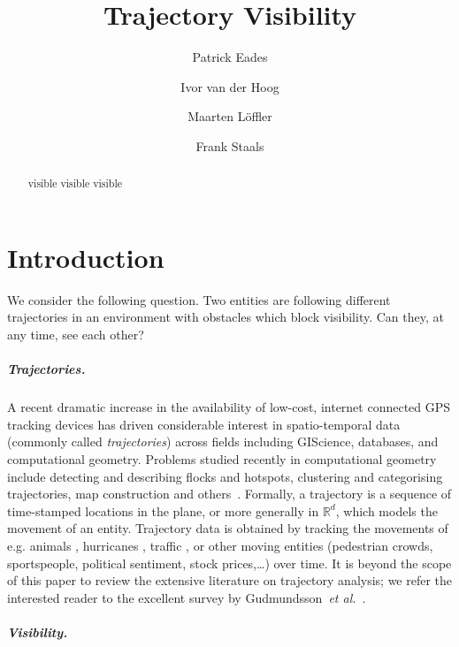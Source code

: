 \documentclass[a4paper, UKenglish]{lipics-v2018}
\title{Trajectory Visibility}
\author{Patrick Eades}{University of Sydney}{patrick.eades@sydney.edu.au}{}{}
\author{Ivor van der Hoog}{Utrecht University}{i.d.vanderhoog@uu.nl}{}{}
\author{Maarten Löffler}{Utrecht University}{m.loffler@uu.nl}{}{}
\author{Frank Staals}{Utrecht University}{f.staals@uu.nl}{}{}
\newcommand{\etal}{\textit{et al.}\xspace}
\newcommand{\mkmbb}[1]{\ensuremath{\mathbb{#1}}\xspace}
\newcommand{\R}{\mkmbb{R}}
\begin{document}
\maketitle

\begin{abstract}
    visible visible visible
\end{abstract}





\newpage


\section {Introduction}

We consider the following question. Two entities are following different trajectories in an environment with obstacles which block visibility. Can they, at any time, see each other? 

\subparagraph {Trajectories.}

A recent dramatic increase in the availability of low-cost, internet connected GPS tracking devices has driven considerable interest in spatio-temporal data (commonly called {\em trajectories}) across fields including GIScience, databases, and computational geometry. 
Problems studied recently in computational geometry include detecting and describing flocks \cite{AnderssonGLW07, BenkertGHW08, LaubeKI04} and hotspots, clustering and categorising trajectories, map construction and others~\cite{bbgll-dcpcs-11,grsc-pcecu-07,gs-tcmrm-99,lhw-tc-07,vgk-dsmt-02}.
Formally, a trajectory is a 
sequence of time-stamped locations 
in the plane, or more generally in $\R^d$, which
models the movement of an entity.
Trajectory data is obtained by tracking the movements of e.g. animals \cite{BovetB88,Calenge200934,gal-nmibc-09}, hurricanes \cite{Stohl1998947}, traffic \cite{lltx-dftf-10}, or other moving entities \cite{dwf-rpm-09} (pedestrian crowds, sportspeople, political sentiment, stock prices,\ldots) over time.
It is beyond the scope of this paper to review the extensive literature on trajectory analysis; we refer the interested reader to the excellent survey by Gudmundsson~\etal~\cite{GudmundssonLW17}.

\subparagraph {Visibility.}
\end{document}
